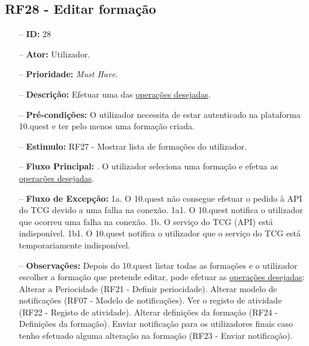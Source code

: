 \subsection{RF28 - Editar formação}
\begin{itemize}
	\item[--] \textbf{ID:} 28
	\item[--]  \textbf{Ator:} Utilizador.
	\item[--]  \textbf{Prioridade:} \textit{Must Have}.
	\item[--]  \textbf{Descrição:} Efetuar uma das \underline{operações desejadas}.
	\item[--]  \textbf{Pré-condições:} O utilizador necessita de estar autenticado na plataforma 10.quest e ter pelo menos uma formação criada.
	\item[--]  \textbf{Estimulo:} RF27 - Mostrar lista de formações do utilizador.
	\item[--]  \textbf{Fluxo Principal:} 
		. O utilizador seleciona uma formação e efetua as \underline{operações desejadas}.
	\item[--]  \textbf{Fluxo de Excepção:} 
		\subitem 1a. O 10.quest não consegue efetuar o pedido à API do TCG devido a uma falha na conexão.
		\subitem 1a1. O 10.quest notifica o utilizador que ocorreu uma falha na conexão.
		\subitem 1b. O serviço do TCG (API) está indisponível.
		\subitem 1b1. O 10.quest notifica o utilizador que o serviço do TCG está temporariamente indisponível. 
	\item[--]  \textbf{Observações:} Depois do 10.quest listar todas as formações e o utilizador escolher a formação que pretende editar, pode efetuar as \underline{operações desejadas}:
		\subitem Alterar a Periocidade (RF21 - Definir periocidade).
		\subitem Alterar modelo de notificações (RF07 - Modelo de notificações).
		\subitem Ver o registo de atividade (RF22 - Registo de atividade).
		\subitem Alterar definições da formação (RF24 - Definições da formação).
		\subitem Enviar notificação para os utilizadores finais caso tenho efetuado alguma alteração na formação (RF23 - Enviar notificação).
\end{itemize}
\newpage

